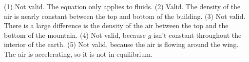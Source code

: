 (1) Not valid. The equation only applies to fluids. (2)
Valid. The density of the air is nearly constant between the
top and bottom of the building. (3) Not valid. There is a
large difference is the density of the air between the top
and the bottom of the mountain. (4) Not valid, because $g$
isn't constant throughout the interior of the earth. (5) Not
valid, because the air is flowing around the wing. The air
is accelerating, so it is not in equilibrium.
